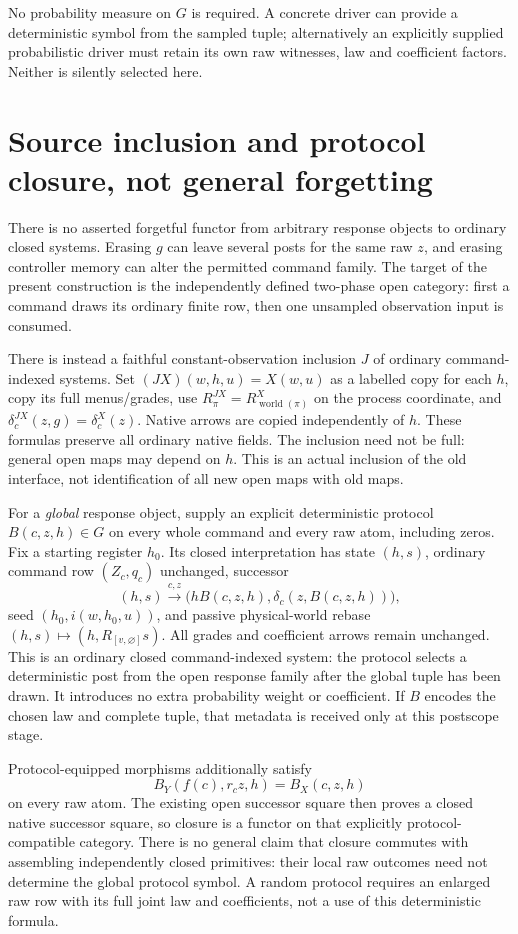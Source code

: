 \documentclass[11pt]{article}
\begin{document}
No probability measure on $G$ is required. A concrete driver can provide a deterministic symbol from the sampled tuple; alternatively an explicitly supplied probabilistic driver must retain its own raw witnesses, law and coefficient factors. Neither is silently selected here.

\section{Source inclusion and protocol closure, not general forgetting}
There is no asserted forgetful functor from arbitrary response objects to ordinary closed systems. Erasing $g$ can leave several posts for the same raw $z$, and erasing controller memory can alter the permitted command family. The target of the present construction is the independently defined two-phase open category: first a command draws its ordinary finite row, then one unsampled observation input is consumed.

There is instead a faithful constant-observation inclusion $J$ of ordinary command-indexed systems. Set $(JX)(w,h,u)=X(w,u)$ as a labelled copy for each $h$, copy its full menus/grades, use $R^{JX}_\pi=R^X_{\operatorname{world}(\pi)}$ on the process coordinate, and $\delta^{JX}_c(z,g)=\delta^X_c(z)$. Native arrows are copied independently of $h$. These formulas preserve all ordinary native fields. The inclusion need not be full: general open maps may depend on $h$. This is an actual inclusion of the old interface, not identification of all new open maps with old maps.

For a \emph{global} response object, supply an explicit deterministic protocol $B(c,z,h)\in G$ on every whole command and every raw atom, including zeros. Fix a starting register $h_0$. Its closed interpretation has state $(h,s)$, ordinary command row $(Z_c,q_c)$ unchanged, successor
\[
 (h,s)\xrightarrow{c,z}\bigl(hB(c,z,h),\delta_c(z,B(c,z,h))\bigr),
\]
seed $(h_0,i(w,h_0,u))$, and passive physical-world rebase $(h,s)\mapsto(h,R_{[v,\varnothing]}s)$. All grades and coefficient arrows remain unchanged. This is an ordinary closed command-indexed system: the protocol selects a deterministic post from the open response family after the global tuple has been drawn. It introduces no extra probability weight or coefficient. If $B$ encodes the chosen law and complete tuple, that metadata is received only at this postscope stage.

Protocol-equipped morphisms additionally satisfy
\[
 B_Y(f(c),r_cz,h)=B_X(c,z,h)
\]
on every raw atom. The existing open successor square then proves a closed native successor square, so closure is a functor on that explicitly protocol-compatible category. There is no general claim that closure commutes with assembling independently closed primitives: their local raw outcomes need not determine the global protocol symbol. A random protocol requires an enlarged raw row with its full joint law and coefficients, not a use of this deterministic formula.
\end{document}
